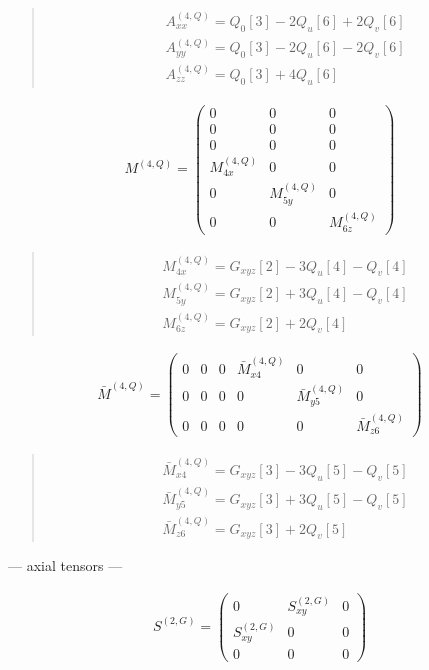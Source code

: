 \documentclass[fleqn,10pt]{jsarticle}
\begin{document}
\begin{quote}
\begin{align*}
& A^{(4,Q)}_{xx} = Q_{0}[3] - 2 Q_{u}[6] + 2 Q_{v}[6] \\
& A^{(4,Q)}_{yy} = Q_{0}[3] - 2 Q_{u}[6] - 2 Q_{v}[6] \\
& A^{(4,Q)}_{zz} = Q_{0}[3] + 4 Q_{u}[6]
\end{align*}
\end{quote}
\begin{align*}
M^{(4,Q)} = \begin{pmatrix} 0 & 0 & 0 \\ 0 & 0 & 0 \\ 0 & 0 & 0 \\ M^{(4,Q)}_{4x} & 0 & 0 \\ 0 & M^{(4,Q)}_{5y} & 0 \\ 0 & 0 & M^{(4,Q)}_{6z} \end{pmatrix}
\end{align*}
\begin{quote}
\begin{align*}
& M^{(4,Q)}_{4x} = G_{xyz}[2] - 3 Q_{u}[4] - Q_{v}[4] \\
& M^{(4,Q)}_{5y} = G_{xyz}[2] + 3 Q_{u}[4] - Q_{v}[4] \\
& M^{(4,Q)}_{6z} = G_{xyz}[2] + 2 Q_{v}[4]
\end{align*}
\end{quote}
\begin{align*}
\bar{M}^{(4,Q)} = \begin{pmatrix} 0 & 0 & 0 & \bar{M}^{(4,Q)}_{x4} & 0 & 0 \\ 0 & 0 & 0 & 0 & \bar{M}^{(4,Q)}_{y5} & 0 \\ 0 & 0 & 0 & 0 & 0 & \bar{M}^{(4,Q)}_{z6} \end{pmatrix}
\end{align*}
\begin{quote}
\begin{align*}
& \bar{M}^{(4,Q)}_{x4} = G_{xyz}[3] - 3 Q_{u}[5] - Q_{v}[5] \\
& \bar{M}^{(4,Q)}_{y5} = G_{xyz}[3] + 3 Q_{u}[5] - Q_{v}[5] \\
& \bar{M}^{(4,Q)}_{z6} = G_{xyz}[3] + 2 Q_{v}[5]
\end{align*}
\end{quote}
\newpage
\begin{center}\LARGE --- axial tensors ---\end{center}
\begin{align*}
S^{(2,G)} = \begin{pmatrix} 0 & S^{(2,G)}_{xy} & 0 \\ S^{(2,G)}_{xy} & 0 & 0 \\ 0 & 0 & 0 \end{pmatrix}
\end{align*}
\end{document}
